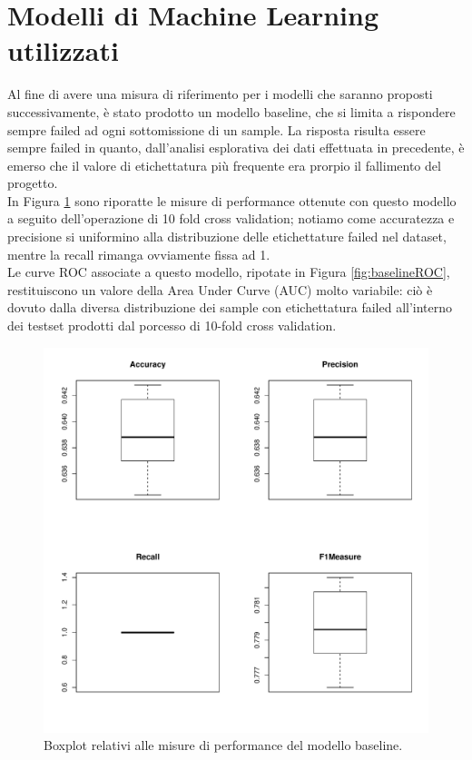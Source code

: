 \section{Modelli di Machine Learning utilizzati}
Al fine di avere una misura di riferimento per i modelli che saranno proposti successivamente, è stato prodotto un modello baseline, che si limita a rispondere sempre failed ad ogni sottomissione di un sample. La risposta risulta essere sempre failed in quanto, dall'analisi esplorativa dei dati effettuata in precedente, è emerso che il valore di etichettatura più frequente era prorpio il fallimento del progetto.\\
In Figura \ref{fig:baselineperformance} sono riporatte le misure di performance ottenute con questo modello a seguito dell'operazione di 10 fold cross validation; notiamo come accuratezza e precisione si uniformino alla distribuzione delle etichettature failed nel dataset, mentre la recall rimanga ovviamente fissa ad 1.\\
Le curve ROC associate a questo modello, ripotate in Figura \ref{fig:baselineROC}, restituiscono un valore della Area Under Curve (AUC) molto variabile: ciò è dovuto dalla diversa distribuzione dei sample con etichettatura failed all'interno dei testset prodotti dal porcesso di 10-fold cross validation.

\begin{figure}
	\centering
	\includegraphics[width=0.7\linewidth]{../FinalResults/Baseline_performance}
	\caption{Boxplot relativi alle misure di performance del modello baseline.}
	\label{fig:baselineperformance}
\end{figure}


